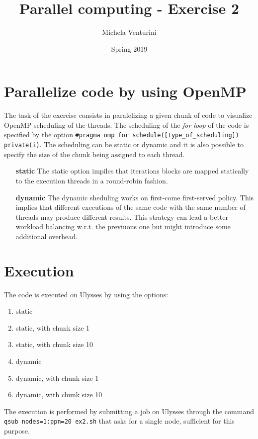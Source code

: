 \documentclass[]{scrartcl}
\title{\textbf{Parallel computing - Exercise 2}}
\author{Michela Venturini}
\date{Spring 2019}
\begin{document}
\maketitle

\section{Parallelize code by using OpenMP}

The task of the exercise consists in paralelizing a given chunk of code to visualize OpenMP scheduling of the threads. The scheduling of the \textit{for loop} of the code is specified by the option \colorbox{mygray}{\texttt{\#pragma omp for schedule([type\_of\_scheduling]) private(i)}}. The scheduling can be static or dynamic and it is also possible to specify the size of the chunk being assigned to each thread.
\begin{itemize}
\item[\textbf{static}] The static option impiles that iterations blocks are mapped statically to the execution threads in a round-robin fashion. 
\item[\textbf{dynamic}] The dynamic sheduling works on first-come first-served policy. This implies that different executions of the same code with the same number of threads may produce different results. This strategy can lead a better workload balancing w.r.t. the previuous one but might introduce some additional overhead.
\end{itemize}

\section{Execution}
The code is executed on Ulysses by using the options:
\begin{enumerate}
	\item static
	\item static, with chunk size 1
	\item static, with chunk size 10
	\item dynamic
	\item dynamic, with chunk size 1
	\item dynamic, with chunk size 10
\end{enumerate}
The execution is performed by submitting a job on Ulysses through the command	\colorbox{mygray}{\texttt{qsub nodes=1:ppn=20 ex2.sh}} that asks for a single node, sufficient for this purpose.
\end{document}
